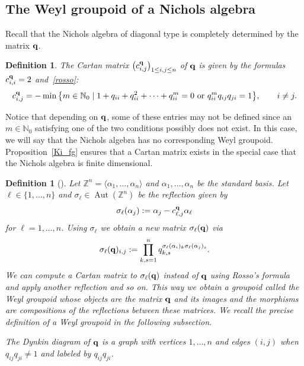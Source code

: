 \documentclass[pdftex]{sigma}
\numberwithin{equation}{section}
\newtheorem{Definition}[Theorem]{Definition}
\newcommand{\NN }{\mathbb{N}}
\newcommand{\ZZ }{\mathbb{Z}}
\DeclareMathOperator{\Aut}{Aut}
\newcommand{\qq }{{\bf q}}
\begin{document}
\subsection{The Weyl groupoid of a Nichols algebra}

Recall that the Nichols algebra of diagonal type is completely determined by the matrix $\qq$.

\begin{Definition}
The {\it Cartan matrix} $\big(c^\qq_{i,j}\big)_{1\le i,j\le n}$ of $\qq$ is given by the formulas $c^\qq_{i,i}=2$ and~\eqref{rosso}:
\begin{gather}\label{rosso_cartan}
c^\qq_{i,j} = -\min\big\{ m\in \NN_0 \mid 1+q_{ii}+q_{ii}^2+\cdots+q_{ii}^m=0 \ \text{or}\ q_{ii}^m q_{ij}q_{ji}=1 \big\}, \qquad i\ne j.
\end{gather}
\end{Definition}
Notice that depending on $\qq$, some of these entries may not be defined since an $m\in\NN_0$ satisfying one of the two conditions possibly does not exist. In this case, we will say that the Nichols algebra has no corresponding Weyl groupoid.
Proposition~\ref{Ki_fg} ensures that a Cartan matrix exists in the special case that the Nichols algebra is finite dimensional.

\begin{Definition}[{\cite{p-H-06}}]
Let $\ZZ^n = \langle \alpha_1,\dots,\alpha_n\rangle$ and $\alpha_1,\dots,\alpha_n$ be the standard basis.
Let $\ell\in\{1,\dots,n\}$ and $\sigma_\ell\in\Aut(\ZZ^n)$ be the reflection given by
\[ \sigma_\ell(\alpha_j):=\alpha_j - c^\qq_{\ell,j}\alpha_\ell \]
for $\ell=1,\dots,n$. Using $\sigma_\ell$ we obtain a new matrix $\sigma_\ell(\qq)$ via
\begin{gather}\label{reflect_q}
\sigma_\ell(\qq)_{i,j} := \prod_{k,s=1}^n q_{k,s}^{\sigma_\ell(\alpha_i)_k \sigma_\ell(\alpha_j)_s}.
\end{gather}
We can compute a Cartan matrix to $\sigma_\ell(\qq)$ instead of $\qq$ using Rosso's formula and apply another reflection and so on.
This way we obtain a groupoid called the {\it Weyl groupoid} whose objects are the matrix $\qq$ and its images and the morphisms are compositions of the reflections between these matrices.
We recall the precise definition of a Weyl groupoid in the following subsection.

The {\it Dynkin diagram} of $\qq$ is a graph with vertices $1,\dots,n$ and edges $(i,j)$ when $q_{ij}q_{ji}\ne 1$ and labeled by $q_{ij}q_{ji}$.
\end{Definition}
\end{document}
